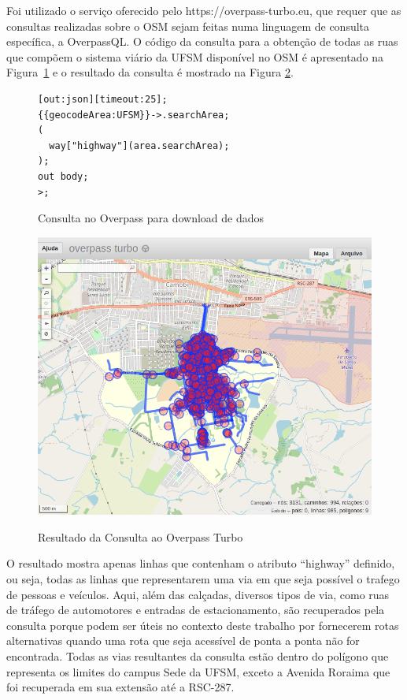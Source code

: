 \documentclass[oneside,openright,12pt]{ufsm_2015} %
\begin{document}
Foi utilizado o serviço oferecido pelo https://overpass-turbo.eu, que requer que as consultas realizadas sobre o OSM sejam feitas numa linguagem de consulta específica, a OverpassQL. 
O código da consulta para a obtenção de todas as ruas que compõem o sistema viário da UFSM disponível no OSM é apresentado na Figura~\ref{codigo:overpass} e o resultado da consulta é mostrado na Figura \ref{screenshot_resultado_overpass}.

\begin{figure}[h!]
    \centering
      \caption{Consulta no Overpass para download de dados}
    \label{codigo:overpass}
    \begin{lstlisting}
[out:json][timeout:25];
{{geocodeArea:UFSM}}->.searchArea;
(
  way["highway"](area.searchArea);
);
out body;
>;
\end{lstlisting}

\end{figure}





\begin{figure}[ht]
    \caption{Resultado da Consulta ao Overpass Turbo}
    \centering
    \includegraphics[scale=0.35]{imagens/screenshot_resultado_overpass.png}
    \label{screenshot_resultado_overpass}
\end{figure}

O resultado mostra apenas linhas que contenham o atributo ``highway'' definido, ou seja, todas as linhas que representarem uma via em que seja possível o trafego de pessoas e veículos. 
Aqui, além das calçadas, diversos tipos de via, como ruas de tráfego de automotores e entradas de estacionamento, são recuperados pela consulta porque podem ser úteis no contexto deste trabalho por fornecerem rotas alternativas quando uma rota que seja acessível de ponta a ponta não for encontrada. 
Todas as vias resultantes da consulta estão dentro do polígono que representa os limites do campus Sede da UFSM, exceto a Avenida Roraima que foi recuperada em sua extensão até a RSC-287.
\end{document}
